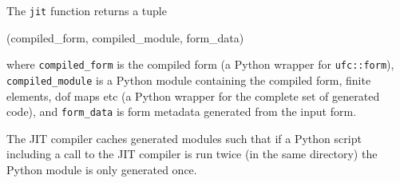 The \texttt{jit} function returns a tuple
\begin{code}
(compiled_form, compiled_module, form_data)
\end{code}
where \texttt{compiled\_form} is the compiled form (a Python wrapper
for \texttt{ufc::form}), \texttt{compiled\_module} is a Python module
containing the compiled form, finite elements, dof maps etc (a Python
wrapper for the complete set of generated code), and
\texttt{form\_data} is form metadata generated from the input form.

The JIT compiler caches generated modules such that if a Python script
including a call to the JIT compiler is run twice (in the same
directory) the Python module is only generated once.
